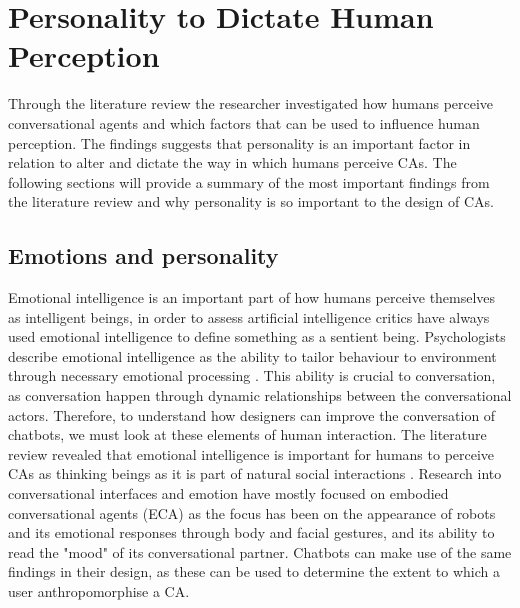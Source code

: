 \section{Personality to Dictate Human Perception}

Through the literature review the researcher investigated how humans perceive conversational agents and which factors that can be used to influence human perception. The findings suggests that personality is an important factor in relation to alter and dictate the way in which humans perceive CAs. The following sections will provide a summary of the most important findings from the literature review and why personality is so important to the design of CAs.

\subsection{Emotions and personality}
Emotional intelligence is an important part of how humans perceive themselves as intelligent beings, in order to assess artificial intelligence critics have always used emotional intelligence to define something as a sentient being. Psychologists describe emotional intelligence as the ability to tailor behaviour to environment through necessary emotional processing \citep{callejas2011}. This ability is crucial to conversation, as conversation happen through dynamic relationships between the conversational actors. Therefore, to understand how designers can improve the conversation of chatbots, we must look at these elements of human interaction. The literature review revealed that emotional intelligence is important for humans to perceive CAs as thinking beings as it is part of natural social interactions \citep{Griol2015a,Griol2017,Balzarotti2014,Lemon2012,Mencia2012,McTear2016a}. Research into conversational interfaces and emotion have mostly focused on embodied conversational agents (ECA) \citep{Lester1997,Stern2003, Beun2003,Reeves1996} as the focus has been on the appearance of robots and its emotional responses through body and facial gestures, and its ability to read the "mood" of its conversational partner. Chatbots can make use of the same findings in their design, as these can be used to determine the extent to which a user anthropomorphise a CA.

